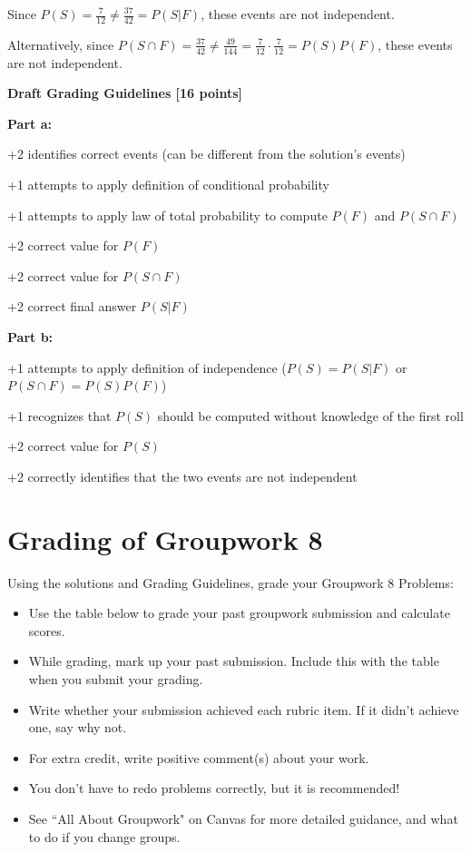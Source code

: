 \documentclass[12pt]{exam}
\newcommand{\prevhwnum}{8}
\begin{document}
\begin{solution}
\begin{qparts}
    Since $P(S) = \frac{7}{12} \neq \frac{37}{42} = P(S | F)$, these events are not independent.

    Alternatively, since $P(S \cap F) = \frac{37}{42} \neq \frac{49}{144} = \frac{7}{12} \cdot \frac{7}{12} = P(S)P(F)$, these events are not independent.

\end{qparts}


\smallskip
\textbf{Draft Grading Guidelines [16 points]}

\textbf{Part a:}
\begin{guidelines}
    \item +2 identifies correct events (can be different from the solution's events)
    \item +1 attempts to apply definition of conditional probability
    \item +1 attempts to apply law of total probability to compute $P(F)$ and $P(S\cap F)$
    \item +2 correct value for $P(F)$
    \item +2 correct value for $P(S\cap F)$
    \item +2 correct final answer $P(S|F)$
\end{guidelines}
\textbf{Part b:}
\begin{guidelines}
    \item +1 attempts to apply definition of independence ($P(S) = P(S|F)$ or $P(S \cap F) = P(S)P(F)$)
    \item +1 recognizes that $P(S)$ should be computed without knowledge of the first roll
    \item +2 correct value for $P(S)$
    \item +2 correctly identifies that the two events are not independent
\end{guidelines}
\end{solution}




\pagebreak
\section*{Grading of Groupwork \prevhwnum{}}
Using the solutions and Grading Guidelines, grade your Groupwork \prevhwnum{} Problems:
\begin{itemize}
    \item Use the table below to grade your past groupwork submission and calculate scores.
    \item While grading, mark up your past submission. Include this with the table when you submit your grading.
    \item Write whether your submission achieved each rubric item. If it didn't achieve one, say why not.
    \item For extra credit, write positive comment(s) about your work.
    \item You don't have to redo problems correctly, but it is recommended!
    \item See ``All About Groupwork" on Canvas for more detailed guidance, and what to do if you change groups.
\end{itemize}
\end{document}
